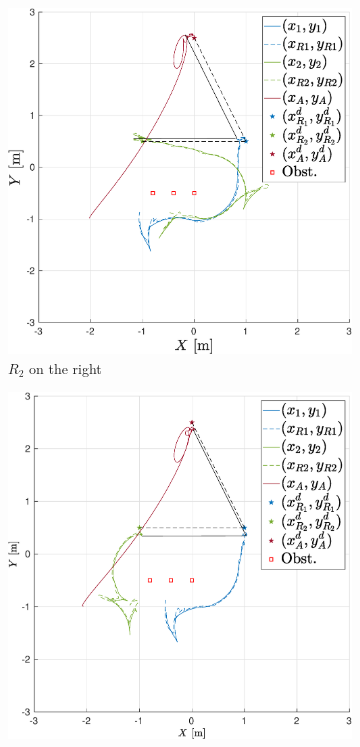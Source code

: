 \documentclass{ifacconf}
\begin{document}
\begin{figure}
    \centering
    \begin{subfigure}[b]{0.31\columnwidth}
        \centering
        \includegraphics[width=\linewidth]{images/experiment/static_obstacles/1st_scenario_exp_bigger.eps}
        \caption{$R_2$ on the right}
        \label{fig:exp_staticObstacles_right}
    \end{subfigure}
    \begin{subfigure}[b]{0.31\columnwidth}
        \centering
        \includegraphics[width=\linewidth]{images/experiment/static_obstacles/1st_scenario_exp_obs_swap_bigger.eps}

\end{subfigure}
\end{figure}
\end{document}
